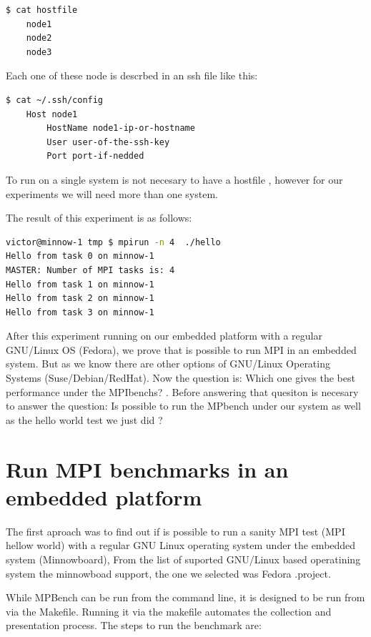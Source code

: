 \begin{lstlisting}[frame=single,language=bash]
  $ cat hostfile
    node1
    node2
    node3
\end{lstlisting}

Each one of these node is descrbed in an ssh file like this:

\begin{lstlisting}[frame=single,language=bash]
  $ cat ~/.ssh/config
    Host node1
        HostName node1-ip-or-hostname
        User user-of-the-ssh-key
        Port port-if-nedded
\end{lstlisting}

To run on a single system is not necesary to have a hostfile , however for our
experiments we will need more than one system.

The result of this experiment is as follows:

\begin{lstlisting}[frame=single,language=bash]
victor@minnow-1 tmp $ mpirun -n 4  ./hello
Hello from task 0 on minnow-1
MASTER: Number of MPI tasks is: 4
Hello from task 1 on minnow-1
Hello from task 2 on minnow-1
Hello from task 3 on minnow-1
\end{lstlisting}

After this experiment running on our embedded platform with a regular GNU/Linux
OS (Fedora), we prove that is possible to run MPI in an embedded system. But as
we know there are other options of GNU/Linux Operating Systems
(Suse/Debian/RedHat). Now the question is: Which one gives the best
performance under the MPIbenchs? . Before answering that quesiton is necesary
to answer the question: Is possible to run the MPbench under our system as well
as the hello world test we just did ?


\section{Run MPI benchmarks in an embedded platform}

The first aproach was to find out if is possible to run a sanity MPI test (MPI
hellow world) with a regular GNU Linux operating system under the embedded
system (Minnowboard\cite{minnowboard}),  From the list of suported GNU/Linux
based operatining system the minnowboad support, the one we selected was Fedora
\cite{fedora}.project. 


While MPBench can be run from the command line, it is designed to be run from
via the Makefile. Running it via the makefile automates the collection and
presentation process. The steps to run the benchmark are: 



